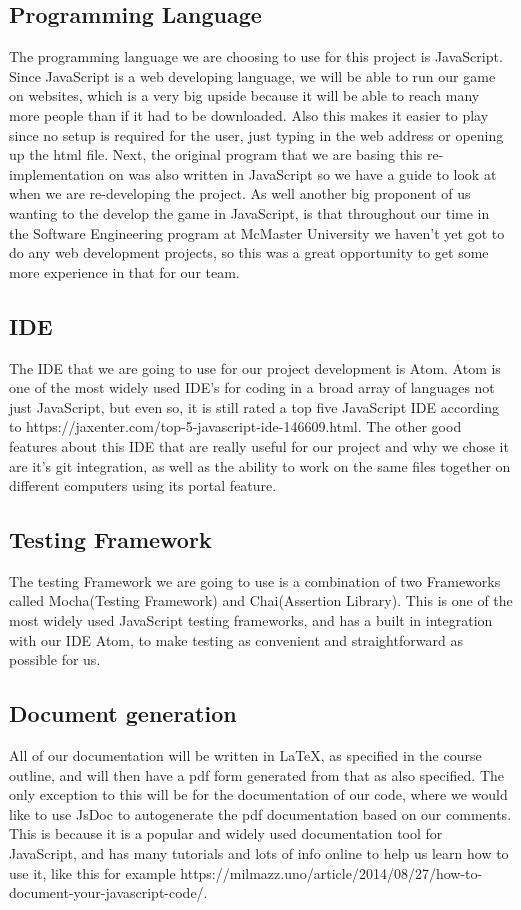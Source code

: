 \documentclass{article}
\begin{document}
\subsection{Programming Language}
The programming language we are choosing to use for this project is JavaScript. Since JavaScript is a web developing language, we will be able to run our game on websites, which is a very big upside because it will be able to reach many more people than if it had to be downloaded. Also this makes it easier to play since no setup is required for the user, just typing in the web address or opening up the html file. Next, the original program that we are basing this re-implementation on was also written in JavaScript so we have a guide to look at when we are re-developing the project. As well another big proponent of us wanting to the develop the game in JavaScript, is that throughout our time in the Software Engineering program at McMaster University we haven’t yet got to do any web development projects, so this was a great opportunity to get some more experience in that for our team.
\subsection{IDE}
The IDE that we are going to use for our project development is Atom. Atom is one of the most widely used IDE’s for coding in a broad array of languages not just JavaScript, but even so, it is still rated a top five JavaScript IDE according to https://jaxenter.com/top-5-javascript-ide-146609.html. The other good features about this IDE that are really useful for our project and why we chose it are it’s git integration, as well as the ability to work on the same files together on different computers using its portal feature.
\subsection{Testing Framework}
The testing Framework we are going to use is a combination of two Frameworks called Mocha(Testing Framework) and Chai(Assertion Library). This is one of the most widely used JavaScript testing frameworks, and has a built in integration with our IDE Atom, to make testing as convenient and straightforward as possible for us.
\subsection{Document generation}
All of our documentation will be written in LaTeX, as specified in the course outline, and will then have a pdf form generated from that as also specified. The only exception to this will be for the documentation of our code, where we would like to use JsDoc to autogenerate the pdf documentation based on our comments. This is because it is a popular and widely used documentation tool for JavaScript, and has many tutorials and lots of info online to help us learn how to use it, like this for example https://milmazz.uno/article/2014/08/27/how-to-document-your-javascript-code/.
\end{document}
